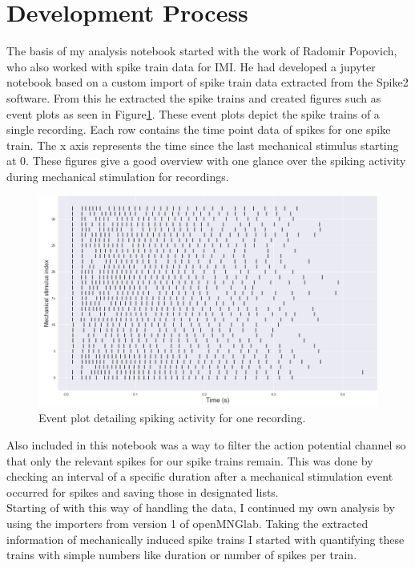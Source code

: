 \section{Development Process}
The basis of my analysis notebook started with the work of Radomir Popovich, who also worked with spike train data for IMI. He had developed a jupyter notebook based on a custom import of spike train data extracted from the Spike2 software. From this he extracted the spike trains and created figures such as event plots as seen in Figure\ref{fig:eventplot}. These event plots depict the spike trains of a single recording. Each row contains the time point data of spikes for one spike train. The x axis represents the time since the last mechanical stimulus starting at 0. These figures give a good overview with one glance over the spiking activity during mechanical stimulation for recordings.
\begin{figure}
	\includegraphics[width = \textwidth]{src/pic/event_plot}
	\caption{Event plot detailing spiking activity for one recording.}
	\label{fig:eventplot}
\end{figure}
Also included in this notebook was a way to filter the action potential channel so that only the relevant spikes for our spike trains remain. This was done by checking an interval of a specific duration after a mechanical stimulation event occurred for spikes and saving those in designated lists.\\
Starting of with this way of handling the data, I continued my own analysis by using the importers from version 1 of openMNGlab. Taking the extracted information of mechanically induced spike trains I started with quantifying these trains with simple numbers like duration or number of spikes per train.\\
